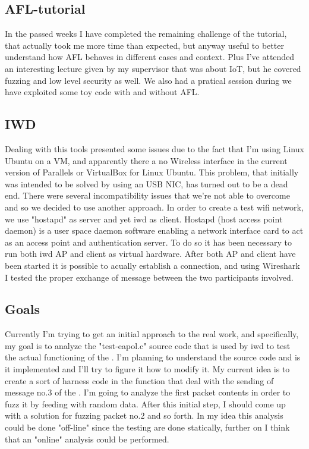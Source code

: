 \subsection{AFL-tutorial}

In the passed weeks I have completed the remaining challenge of the tutorial, that actually took me more time than expected, but anyway useful to better understand how AFL behaves in different 
cases and context. Plus I've attended an interesting lecture given by my supervisor that was about IoT, but he covered fuzzing and low level security as well. We also had a pratical session during we have 
exploited some toy code with and without AFL. 

\subsection{IWD} 
Dealing with this tools presented some issues due to the fact that I'm using Linux Ubuntu on a VM, and apparently
there a no Wireless interface in the current version of Parallels or VirtualBox for Linux Ubuntu. This problem, that initially was intended to be solved
by using an USB NIC, has turned out to be a dead end. There were several incompatibility issues that we're not able to overcome and so we decided to use another approach.
In order to create a test wifi network, we use "hostapd" as server and yet iwd as client. Hostapd (host access point daemon) is a user space daemon software enabling a network interface card to act as an access point and authentication server. 
To do so it has been necessary to run both iwd AP and client as virtual hardware. After both AP and client have been started it is possible to acually establish a connection, and 
using Wireshark I tested the proper exchange of message between the two participants involved. 

\subsection{Goals}
Currently I'm trying to get an initial approach to the real work, and specifically, my goal is to analyze the "test-eapol.c" source code that is used by iwd to test the actual 
functioning of the \fwh. I'm planning to understand the source code and is it implemented and I'll try to figure it how to modify it. My current idea is to create a sort of harness code in the function that deal with 
the sending of message no.3 of the \fwh. I'm going to analyze the first packet contents in order to fuzz it by feeding with random data.
After this initial step, I should come up with a solution for fuzzing packet no.2 and so forth.
In my idea this analysis could be done "off-line" since the testing are done statically, further on I think that an "online" analysis could be performed.







